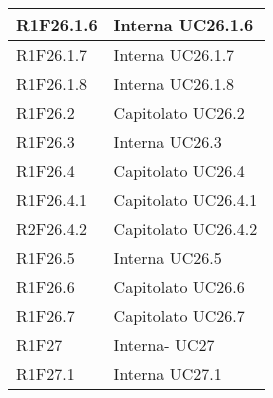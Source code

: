 \begin{center}
\begin{longtable}{|p{22mm}|p{44mm}|}
R1F26.1.6 &
Interna \newline
UC26.1.6 \newline
\\
\hline

R1F26.1.7 &
Interna \newline
UC26.1.7 \newline
\\
\hline

R1F26.1.8 &
Interna \newline
UC26.1.8 \newline
\\
\hline

R1F26.2 &
Capitolato \newline
UC26.2 \newline
\\
\hline

R1F26.3 &
Interna \newline
UC26.3 \newline
\\
\hline

R1F26.4 &
Capitolato \newline
UC26.4 \newline
\\
\hline

R1F26.4.1 &
Capitolato \newline
UC26.4.1 \newline
\\
\hline

R2F26.4.2 &
Capitolato \newline
UC26.4.2 \newline
\\
\hline

R1F26.5 &
Interna \newline
UC26.5 \newline
\\
\hline

R1F26.6 &
Capitolato \newline
UC26.6 \newline
\\
\hline

R1F26.7 &
Capitolato \newline
UC26.7 \newline
\\
\hline

R1F27 &
Interna- UC27 \newline
\\
\hline

R1F27.1 &
Interna \newline
UC27.1 \newline
\\
\hline


\end{longtable}
\end{center}
